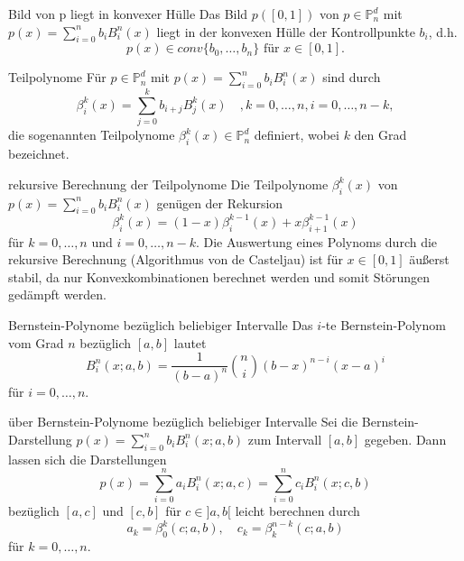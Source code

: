 \begin{flashcard}[Satz]{Bild von p liegt in konvexer Hülle}
Das Bild $p([0,1])$ von $p \in \mathbb{P}_n^d$ mit $p(x) = \sum_{i=0}^n b_i B_i^n(x)$
liegt in der konvexen Hülle der Kontrollpunkte $b_i$, d.h.
$$
	p(x) \in conv\lbrace b_0, \ldots , b_n \rbrace \text{ für } x \in [0,1].
$$
\end{flashcard}

\begin{flashcard}[Definition]{Teilpolynome}
Für $p \in \mathbb{P}_n^d$ mit $p(x) = \sum_{i=0}^n b_i B_i^n(x)$ sind durch
$$
	\beta_i^k(x) = \sum_{j=0}^k b_{i+j}B_j^k(x) \quad , k=0, \ldots , n, i=0, \ldots, n-k,
$$
die sogenannten Teilpolynome $\beta_i^k(x) \in \mathbb{P}_n^d$ definiert, wobei $k$ den Grad bezeichnet.
\end{flashcard}

\begin{flashcard}[Satz]{rekursive Berechnung der Teilpolynome}
Die Teilpolynome $\beta_i^k(x)$ von $p(x) = \sum_{i=0}^n b_i B_i^n(x)$ genügen der Rekursion
$$
	\beta_i^k(x) = (1-x)\beta_i^{k-1}(x) + x\beta_{i+1}^{k-1}(x)
$$
für $k=0, \ldots , n$ und $i = 0, \ldots , n-k$. \linebreak
Die Auswertung eines Polynoms durch die rekursive Berechnung (Algorithmus von de Casteljau)
ist für $x \in  [0,1]$ äußerst stabil, da nur Konvexkombinationen berechnet werden und somit Störungen gedämpft werden.
\end{flashcard}

\begin{flashcard}[Definition]{Bernstein-Polynome bezüglich beliebiger Intervalle}
Das $i$-te Bernstein-Polynom vom Grad $n$ bezüglich $[a,b]$ lautet
$$
	B_i^n(x; a, b) = \frac{1}{(b-a)^n}\binom{n}{i}(b-x)^{n-i}(x-a)^i
$$
für $i=0, \ldots , n$.
\end{flashcard}

\begin{flashcard}[Satz]{über Bernstein-Polynome bezüglich beliebiger Intervalle}
Sei die Bernstein-Darstellung $p(x) = \sum_{i=0}^n b_i B_i^n(x; a, b)$ zum Intervall $[a,b]$ gegeben.
Dann lassen sich die Darstellungen
$$
	p(x) = \sum_{i=0}^n a_i B_i^n(x; a, c) = \sum_{i=0}^n c_i B_i^n(x; c, b)
$$
bezüglich $[a, c]$ und $[c, b]$ für $c \in ]a, b[$ leicht berechnen durch
$$
	a_k = \beta_0^k(c; a,b), \quad c_k = \beta_k^{n-k}(c; a, b)
$$
für $k=0, \ldots ,n$.
\end{flashcard}


